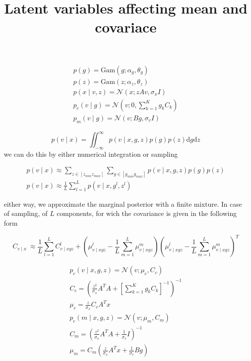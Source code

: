 \documentclass{paper}
\begin{document}
\title{Latent variables affecting mean and covariace}
\maketitle

\begin{eqnarray}
p(g) = \textrm{Gam}(g; \alpha_g,\theta_g) \\
p(z) = \textrm{Gam}(z; \alpha_z,\theta_z) \\
p(x \mid v,z) = \mathcal{N}(x; zAv,\sigma_x I) \\
p_c(v \mid g) = \mathcal{N}(v; 0,\sum_{k=1}^K g_k C_k) \\
p_m(v \mid g) = \mathcal{N}(v; Bg,\sigma_v I)
\end{eqnarray}

\begin{equation}
p(v \mid x) = \iint_{-\infty}^\infty p(v \mid x,g,z) p(g) p(z) \mathrm{d}g \mathrm{d}z
\end{equation}
%
we can do this by either numerical integration or sampling

\begin{eqnarray}
p(v \mid x) \approx \sum_{z \in \left[z_{min} z_{max} \right]}  \sum_{g \in \left[g_{min} g_{max} \right]} p(v \mid x,g,z) p(g) p(z) \\
p(v \mid x) \approx \frac{1}{L} \sum_{l=1}^L p(v \mid x,g^l,z^l)
\end{eqnarray}

either way, we approximate the marginal posterior with a finite mixture. In case of sampling, of $L$ components, for wich the covariance is given in the following form

\begin{equation}
C_{v \mid x} ~ \approx \frac{1}{L} \sum_{l=1}^L C_{v \mid xgz}^l + ( \mu_{v \mid xgz}^l - \frac{1}{L} \sum_{m=1}^L \mu_{v \mid xgz}^m) ( \mu_{v \mid xgz}^l - \frac{1}{L} \sum_{m=1}^L \mu_{v \mid xgz}^m)^T
\end{equation}

\begin{eqnarray}
p_c(v \mid x,g,z) = \mathcal{N}(v;\mu_c,C_c) \\
C_c =  \left(\frac{z^2}{\sigma_x} A^T A + \left[\sum_{k=1}^K g_k C_k \right]^{-1}\right)^{-1} \\
\mu_c = \frac{z}{\sigma_x} C_c A^T x \\
p_c(m \mid x,g,z) = \mathcal{N}(v;\mu_m,C_m) \\
C_m =  \left(\frac{z^2}{\sigma_x} A^T A + \frac{1}{\sigma_v} I \right)^{-1} \\
\mu_m = C_m \left(\frac{z}{\sigma_x} A^T x +  \frac{1}{\sigma_v} B g \right)
\end{eqnarray}
\end{document}
